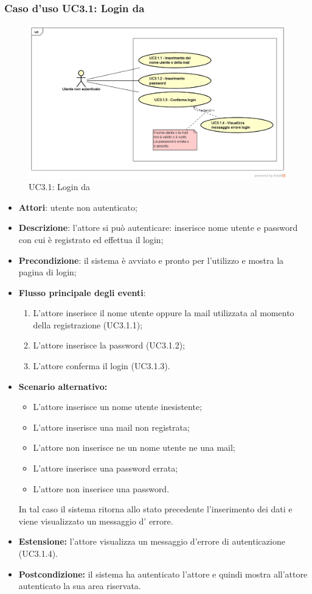 \subsubsection{Caso d'uso UC3.1: Login da \progetto}
\label{UC3.1}
\begin{figure}
	\centering
	\includegraphics[scale=0.5]{UML/UC3_1.png}
	\caption{UC3.1: Login da \progetto}
\end{figure}
\FloatBarrier
\begin{itemize}
	\item \textbf{Attori}: utente non autenticato;
	\item \textbf{Descrizione}: l'attore si può autenticare: inserisce nome utente e password con cui è registrato ed effettua il login;
	\item \textbf{Precondizione}: il sistema è avviato e pronto per l'utilizzo e mostra la pagina di login;
	\item \textbf{Flusso principale degli eventi}:
	\begin{enumerate}
		\item L'attore inserisce il nome utente oppure la mail utilizzata al momento della registrazione (UC3.1.1);
		\item L'attore inserisce la password (UC3.1.2);
		\item L'attore conferma il login (UC3.1.3).
	\end{enumerate}
	\item \textbf{Scenario alternativo:}
	\begin{itemize}
		\item L'attore inserisce un nome utente inesistente;
		\item L'attore inserisce una mail non registrata;
		\item L'attore non inserisce ne un nome utente ne una mail;
		\item L'attore inserisce una password errata;
		\item L'attore non inserisce una password.
	\end{itemize}
	In tal caso il sistema ritorna allo stato precedente l'inserimento dei dati e viene visualizzato un messaggio d' errore.
	\item \textbf{Estensione:} l'attore visualizza un messaggio d'errore di autenticazione (UC3.1.4).
	\item \textbf{Postcondizione:} il sistema ha autenticato l'attore e quindi mostra all'attore autenticato la sua area riservata.
\end{itemize}

